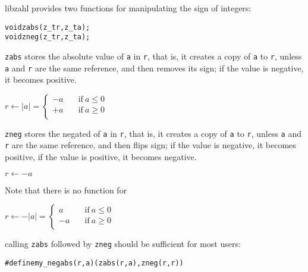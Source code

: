 libzahl provides two functions for manipulating
the sign of integers:

\begin{alltt}
   void zabs(z_t r, z_t a);
   void zneg(z_t r, z_t a);
\end{alltt}

{\tt zabs} stores the absolute value of {\tt a}
in {\tt r}, that is, it creates a copy of
{\tt a} to {\tt r}, unless {\tt a} and {\tt r}
are the same reference, and then removes its sign;
if the value is negative, it becomes positive.

\vspace{1em}
\(
    r \gets \lvert a \rvert =
    \left \lbrace \begin{array}{rl}
        -a & \quad \textrm{if}~a \le 0 \\
        +a & \quad \textrm{if}~a \ge 0 \\
    \end{array} \right .
\)
\vspace{1em}

{\tt zneg} stores the negated of {\tt a}
in {\tt r}, that is, it creates a copy of
{\tt a} to {\tt r}, unless {\tt a} and {\tt r}
are the same reference, and then flips sign;
if the value is negative, it becomes positive,
if the value is positive, it becomes negative.

\vspace{1em}
\(
    r \gets -a
\)
\vspace{1em}

Note that there is no function for

\vspace{1em}
\(
    r \gets -\lvert a \rvert =
    \left \lbrace \begin{array}{rl}
         a & \quad \textrm{if}~a \le 0 \\
        -a & \quad \textrm{if}~a \ge 0 \\
    \end{array} \right .
\)
\vspace{1em}

\noindent
calling {\tt zabs} followed by {\tt zneg}
should be sufficient for most users:

\begin{alltt}
   #define my_negabs(r, a)  (zabs(r, a), zneg(r, r))
\end{alltt}
